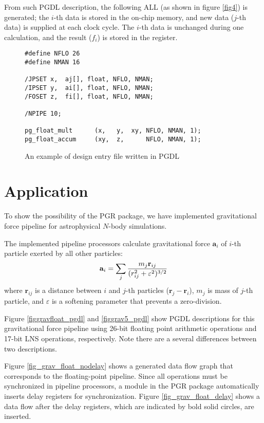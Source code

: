 \documentclass{llncs}
\begin{document}
From such PGDL description, the following ALL (as shown in figure \ref{fig4})
is generated; the $i$-th data is stored in the on-chip memory,
and new data ($j$-th data) is supplied at each clock cycle.
The $i$-th data is unchanged during one calculation, and 
the result ($f_i$) is stored in the register.

\begin{figure}
\scriptsize
\begin{verbatim}
#define NFLO 26
#define NMAN 16

/JPSET x,  aj[], float, NFLO, NMAN;
/IPSET y,  ai[], float, NFLO, NMAN;
/FOSET z,  fi[], float, NFLO, NMAN;

/NPIPE 10;

pg_float_mult      (x,   y,  xy, NFLO, NMAN, 1);
pg_float_accum     (xy,  z,      NFLO, NMAN, 1);
\end{verbatim}
\caption{An example of design entry file written in PGDL}
\label{fig5}
\end{figure}


\section{Application}
To show the possibility of the PGR package, we have implemented gravitational
force pipeline for astrophysical $N$-body simulations.

The implemented pipeline processors calculate gravitational force 
$\mathbf{a}_i$ of $i$-th particle exerted by all other particles:
\begin{equation}
\mathbf{ a}_i = \sum_j {m_j \mathbf{ r}_{ij} \over (r_{ij}^2 + \varepsilon^2)^{3/2}}
\end{equation}
where $\mathbf{r}_{ij}$ is a distance between $i$ and $j$-th particles
($\mathbf{r}_j - \mathbf{r}_i $), 
$m_{j}$ is mass of $j$-th particle, and $\varepsilon$ is a softening parameter
that prevents a zero-division.

Figure \ref{figgravfloat_pgdl} and \ref{figgrav5_pgdl}
show PGDL descriptions for this gravitational force pipeline
using 26-bit floating point arithmetic operations and
17-bit LNS operations, respectively.
Note there are a several differences between two descriptions.

Figure \ref{fig_grav_float_nodelay} shows a generated 
data flow graph that corresponds to the floating-point pipeline.
Since all operations must be synchronized in pipeline processors, 
a module in the PGR package automatically inserts
delay registers for synchronization.
Figure \ref{fig_grav_float_delay} shows a data flow
after the delay registers, which are indicated by bold solid circles, are inserted.
\end{document}
